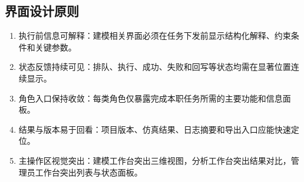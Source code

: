 \subsection{界面设计原则}
\begin{enumerate}[label=\arabic*.]
    \item 执行前信息可解释：建模相关界面必须在任务下发前显示结构化解释、约束条件和关键参数。
    \item 状态反馈持续可见：排队、执行、成功、失败和回写等状态均需在显著位置连续显示。
    \item 角色入口保持收敛：每类角色仅暴露完成本职任务所需的主要功能和信息面板。
    \item 结果与版本易于回看：项目版本、仿真结果、日志摘要和导出入口应能快速定位。
    \item 主操作区视觉突出：建模工作台突出三维视图，分析工作台突出结果对比，管理员工作台突出列表与状态面板。
\end{enumerate}
